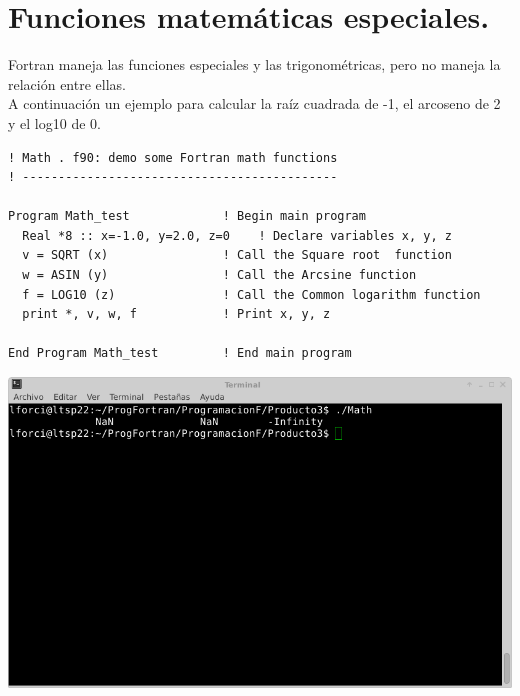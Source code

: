\documentclass[10pt]{article}
\begin{document}
\section{Funciones matemáticas especiales.}
Fortran maneja las funciones especiales y las trigonométricas, pero no maneja la relación entre ellas.\\
A continuación un ejemplo para calcular la raíz cuadrada de -1, el arcoseno de 2 y el log10 de 0.

\begin{verbatim}
! Math . f90: demo some Fortran math functions
! --------------------------------------------

Program Math_test             ! Begin main program
  Real *8 :: x=-1.0, y=2.0, z=0    ! Declare variables x, y, z
  v = SQRT (x)                ! Call the Square root  function
  w = ASIN (y)                ! Call the Arcsine function
  f = LOG10 (z)               ! Call the Common logarithm function
  print *, v, w, f            ! Print x, y, z
 
End Program Math_test         ! End main program
\end{verbatim}
\includegraphics[scale=0.6]{Math}
\end{document}
